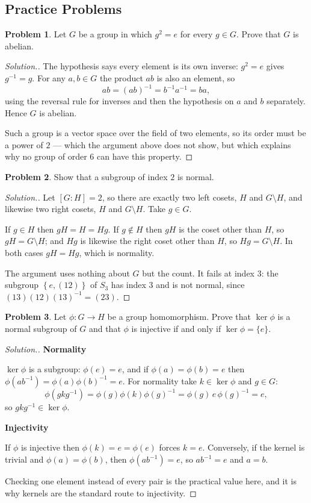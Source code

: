 \documentclass[11pt,a4paper]{article}
\theoremstyle{definition}
\newtheorem{problemx}{Problem}[subsection]
\newenvironment{problem}{\begin{problemx}}{\end{problemx}}
\newenvironment{solution}
  {\renewcommand{\qedsymbol}{}\begin{proof}[\textit{Solution}.]}
  {\end{proof}}
\newcommand{\subhead}[1]{%
  \par\medskip\noindent\textbf{#1}\par\nobreak\smallskip}
\begin{document}
\subsection{Practice Problems}

\begin{problem}
Let $G$ be a group in which $g^{2}=e$ for every $g\in G$. Prove that $G$ is
abelian.
\end{problem}
\begin{solution}
The hypothesis says every element is its own inverse: $g^{2}=e$ gives
$g^{-1}=g$. For any $a,b\in G$ the product $ab$ is also an element, so
$$ab = (ab)^{-1} = b^{-1}a^{-1} = ba ,$$
using the reversal rule for inverses and then the hypothesis on $a$ and $b$
separately. Hence $G$ is abelian.

Such a group is a vector space over the field of two elements, so its order must
be a power of $2$ --- which the argument above does not show, but which explains
why no group of order $6$ can have this property.
\end{solution}

\begin{problem}
Show that a subgroup of index $2$ is normal.
\end{problem}
\begin{solution}
Let $[G:H]=2$, so there are exactly two left cosets, $H$ and $G\setminus H$, and
likewise two right cosets, $H$ and $G\setminus H$. Take $g\in G$.

If $g\in H$ then $gH = H = Hg$. If $g\notin H$ then $gH$ is the coset other than
$H$, so $gH = G\setminus H$; and $Hg$ is likewise the right coset other than
$H$, so $Hg = G\setminus H$. In both cases $gH = Hg$, which is normality.

The argument uses nothing about $G$ but the count. It fails at index $3$: the
subgroup $\left\{e,(12)\right\}$ of $S_3$ has index $3$ and is not normal, since
$(13)(12)(13)^{-1} = (23)$.
\end{solution}

\begin{problem}
Let $\phi: G\rightarrow H$ be a group homomorphism. Prove that $\ker\phi$ is a
normal subgroup of $G$ and that $\phi$ is injective if and only if
$\ker\phi=\{e\}$.
\end{problem}
\begin{solution}
\subhead{Normality}
$\ker\phi$ is a subgroup: $\phi(e)=e$, and if $\phi(a)=\phi(b)=e$ then
$\phi(ab^{-1}) = \phi(a)\phi(b)^{-1} = e$. For normality take $k\in\ker\phi$ and
$g\in G$:
$$\phi\left(gkg^{-1}\right) = \phi(g)\phi(k)\phi(g)^{-1}
= \phi(g)\,e\,\phi(g)^{-1} = e ,$$
so $gkg^{-1}\in\ker\phi$.

\subhead{Injectivity}
If $\phi$ is injective then $\phi(k)=e=\phi(e)$ forces $k=e$. Conversely, if the
kernel is trivial and $\phi(a)=\phi(b)$, then
$\phi\left(ab^{-1}\right)=e$, so $ab^{-1}=e$ and $a=b$.

Checking one element instead of every pair is the practical value here, and it
is why kernels are the standard route to injectivity.
\end{solution}
\end{document}
